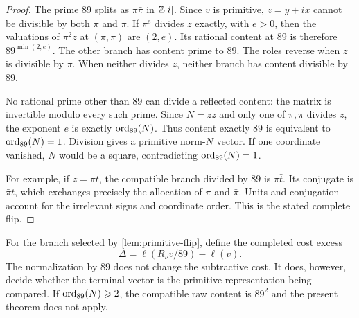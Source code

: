 \begin{proof}
The prime $89$ splits as $\pi\bar\pi$ in $\mathbb{Z}[i]$. Since $v$ is primitive,
$z=y+ix$ cannot be divisible by both $\pi$ and $\bar\pi$. If $\pi^e$ divides
$z$ exactly, with $e>0$, then the valuations of $\pi^2\bar z$ at
$(\pi,\bar\pi)$ are $(2,e)$. Its rational content at $89$ is therefore
$89^{\min(2,e)}$. The other branch has content prime to $89$. The roles
reverse when $z$ is divisible by $\bar\pi$. When neither divides $z$,
neither branch has content divisible by $89$.

No rational prime other than $89$ can divide a reflected content: the
matrix is invertible modulo every such prime. Since $N=z\bar z$ and only
one of $\pi,\bar\pi$ divides $z$, the exponent $e$ is exactly
$\operatorname{ord}_{89}(N)$. Thus content exactly $89$ is equivalent to $\operatorname{ord}_{89}(N)=1$. Division gives a primitive norm-$N$ vector.
If one coordinate vanished, $N$ would be a square, contradicting
$\operatorname{ord}_{89}(N)=1$.

For example, if $z=\pi t$, the compatible branch divided by $89$ is
$\pi\bar t$. Its conjugate is $\bar\pi t$, which exchanges precisely the
allocation of $\pi$ and $\bar\pi$. Units and conjugation account for the
irrelevant signs and coordinate order. This is the stated complete flip.
\end{proof}

For the branch selected by \cref{lem:primitive-flip}, define the completed
cost excess
\begin{equation}
 \Delta=\ell(R_\nu v/89)-\ell(v).
 \label{eq:completed-excess}
\end{equation}
The normalization by $89$ does not change the subtractive cost. It does,
however, decide whether the terminal vector is the primitive
representation being compared. If $\operatorname{ord}_{89}(N)\geqslant2$, the compatible
raw content is $89^2$ and the present theorem does not apply.
